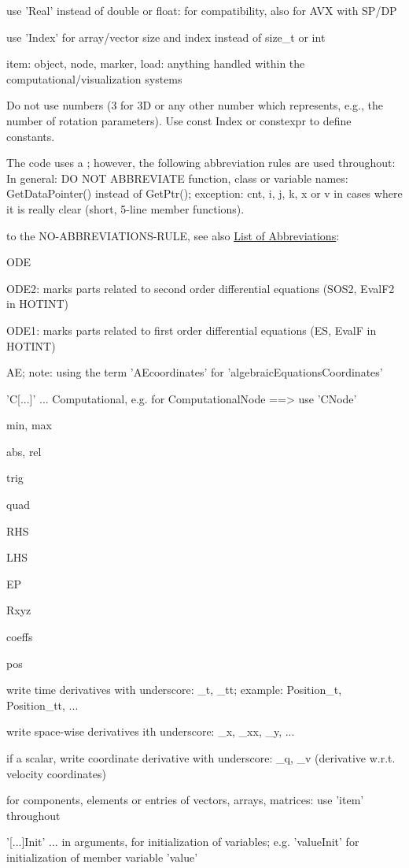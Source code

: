     \item use 'Real' instead of double or float: for compatibility, also for AVX with SP/DP
    \item use 'Index' for array/vector size and index instead of size\_t or int
    \item item: object, node, marker, load: anything handled within the computational/visualization systems
    \item Do not use numbers (3 for 3D or any other number which represents, e.g., the number of rotation parameters). Use const Index or constexpr to define constants.
\ei

%
The code uses a ; however, the following abbreviation rules are used throughout:
In general: DO NOT ABBREVIATE function, class or variable names: GetDataPointer() instead of GetPtr(); exception: cnt, i, j, k, x or v in cases where it is really clear (short, 5-line member functions).

 to the NO-ABBREVIATIONS-RULE, see also \hyperref[sec:listOfAbbreviations]{\underline{List of Abbreviations}}: %
\bi
    \item \ac{ODE}
    \item \ac{ODE2}: marks parts related to second order differential equations (SOS2, EvalF2 in HOTINT)
    \item \ac{ODE1}: marks parts related to first order differential equations (ES, EvalF in HOTINT)
    \item \ac{AE}; note: using the term 'AEcoordinates' for 'algebraicEquationsCoordinates'
    \item 'C[...]' ... Computational, e.g. for ComputationalNode ==> use 'CNode'
    \item \ac{min}, \ac{max}
    \item \ac{abs}, \ac{rel}
    \item \ac{trig} 
    \item \ac{quad}
    \item \ac{RHS}
    \item \ac{LHS}
    \item \ac{EP}
    \item \ac{Rxyz}%
    \item \ac{coeffs}
    \item \ac{pos}
    \item write time derivatives with underscore: \_t, \_tt; example: Position\_t, Position\_tt, ...
    \item write space-wise derivatives ith underscore: \_x, \_xx, \_y, ...
    \item if a scalar, write coordinate derivative with underscore: \_q, \_v (derivative w.r.t. velocity coordinates)
    \item for components, elements or entries of vectors, arrays, matrices: use 'item' throughout
    \item '[...]Init' ... in arguments, for initialization of variables; e.g. 'valueInit' for initialization of member variable 'value'
\ei

